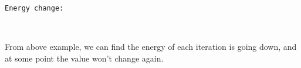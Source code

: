 \documentclass[11pt]{article}
\begin{document}
    \begin{Verbatim}[commandchars=\\\{\}]

Energy change:

    \end{Verbatim}

    \begin{center}
    \end{center}
    { \hspace*{\fill} \\}
    
    From above example, we can find the energy of each iteration is going
down, and at some point the value won't change again.


    
    
    
    
\end{document}
